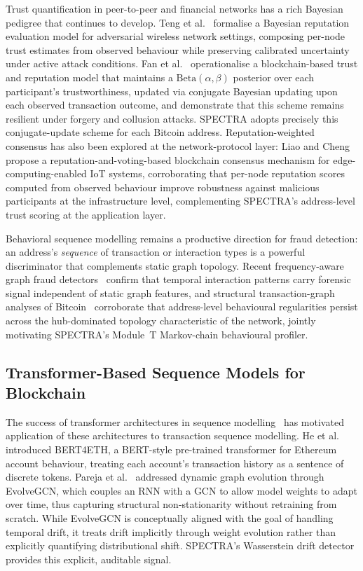 \documentclass[journal]{IEEEtran}
\newcommand{\spectra}{\textsc{SPECTRA}}
\begin{document}
Trust quantification in peer-to-peer and financial networks has a rich Bayesian
pedigree that continues to develop.  Teng et al.~\cite{Teng2024} formalise a
Bayesian reputation evaluation model for adversarial wireless network settings,
composing per-node trust estimates from observed behaviour while preserving
calibrated uncertainty under active attack conditions.  Fan et
al.~\cite{Fan2025} operationalise a blockchain-based trust and reputation model
that maintains a $\text{Beta}(\alpha, \beta)$ posterior over each participant's
trustworthiness, updated via conjugate Bayesian updating upon each observed
transaction outcome, and demonstrate that this scheme remains resilient under
forgery and collusion attacks.  \spectra{} adopts precisely this
conjugate-update scheme for each Bitcoin address.  Reputation-weighted
consensus has also been explored at the network-protocol layer: Liao and
Cheng~\cite{Liao2023} propose a reputation-and-voting-based blockchain
consensus mechanism for edge-computing-enabled IoT systems, corroborating that
per-node reputation scores computed from observed behaviour improve robustness
against malicious participants at the infrastructure level, complementing
\spectra{}'s address-level trust scoring at the application layer.

Behavioral sequence modelling remains a productive direction for fraud
detection: an address's \emph{sequence} of transaction or interaction types is
a powerful discriminator that complements static graph topology.  Recent
frequency-aware graph fraud detectors~\cite{ZhaoW2026} confirm that temporal
interaction patterns carry forensic signal independent of static graph
features, and structural transaction-graph analyses of Bitcoin~\cite{Li2023}
corroborate that address-level behavioural regularities persist across the
hub-dominated topology characteristic of the network, jointly motivating
\spectra{}'s Module~T Markov-chain behavioural profiler.

\subsection{Transformer-Based Sequence Models for Blockchain}
\label{subsec:transformers_related}

The success of transformer architectures in sequence
modelling~\cite{Yang2023} has motivated application of these architectures
to transaction sequence modelling.  He et al.~\cite{He2023} introduced BERT4ETH, a
BERT-style pre-trained transformer for Ethereum account behaviour, treating each
account's transaction history as a sentence of discrete tokens.
Pareja et al.~\cite{Pareja2020} addressed dynamic graph evolution through
EvolveGCN, which couples an RNN with a GCN to allow model weights to adapt over
time, thus capturing structural non-stationarity without retraining from
scratch.  While EvolveGCN is conceptually aligned with the goal of handling
temporal drift, it treats drift implicitly through weight evolution rather than
explicitly quantifying distributional shift.  \spectra{}'s Wasserstein drift
detector provides this explicit, auditable signal.
\end{document}
